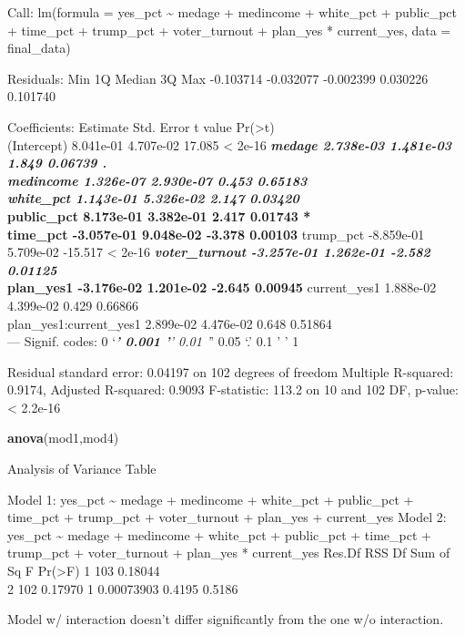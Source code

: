 \documentclass[
]{article}
\newenvironment{Shaded}{\begin{snugshade}}{\end{snugshade}}
\newcommand{\KeywordTok}[1]{\textcolor[rgb]{0.13,0.29,0.53}{\textbf{#1}}}
\newcommand{\NormalTok}[1]{#1}
\begin{document}
Call: lm(formula = yes\_pct \textasciitilde{} medage + medincome +
white\_pct + public\_pct + time\_pct + trump\_pct + voter\_turnout +
plan\_yes * current\_yes, data = final\_data)

Residuals: Min 1Q Median 3Q Max -0.103714 -0.032077 -0.002399 0.030226
0.101740

Coefficients: Estimate Std. Error t value
Pr(\textgreater\textbar t\textbar)\\
(Intercept) 8.041e-01 4.707e-02 17.085 \textless{} 2e-16 \textbf{\emph{
medage 2.738e-03 1.481e-03 1.849 0.06739 .\\
medincome 1.326e-07 2.930e-07 0.453 0.65183\\
white\_pct 1.143e-01 5.326e-02 2.147 0.03420 }\\
public\_pct 8.173e-01 3.382e-01 2.417 0.01743 *\\
time\_pct -3.057e-01 9.048e-02 -3.378 0.00103 } trump\_pct -8.859e-01
5.709e-02 -15.517 \textless{} 2e-16 \textbf{\emph{ voter\_turnout
-3.257e-01 1.262e-01 -2.582 0.01125 }\\
plan\_yes1 -3.176e-02 1.201e-02 -2.645 0.00945 } current\_yes1 1.888e-02
4.399e-02 0.429 0.66866\\
plan\_yes1:current\_yes1 2.899e-02 4.476e-02 0.648 0.51864\\
--- Signif. codes: 0 `\emph{\textbf{' 0.001 '}' 0.01 '}' 0.05 `.' 0.1 '
' 1

Residual standard error: 0.04197 on 102 degrees of freedom Multiple
R-squared: 0.9174, Adjusted R-squared: 0.9093 F-statistic: 113.2 on 10
and 102 DF, p-value: \textless{} 2.2e-16

\begin{Shaded}
\begin{Highlighting}[]
\KeywordTok{anova}\NormalTok{(mod1,mod4)}
\end{Highlighting}
\end{Shaded}

Analysis of Variance Table

Model 1: yes\_pct \textasciitilde{} medage + medincome + white\_pct +
public\_pct + time\_pct + trump\_pct + voter\_turnout + plan\_yes +
current\_yes Model 2: yes\_pct \textasciitilde{} medage + medincome +
white\_pct + public\_pct + time\_pct + trump\_pct + voter\_turnout +
plan\_yes * current\_yes Res.Df RSS Df Sum of Sq F Pr(\textgreater F) 1
103 0.18044\\
2 102 0.17970 1 0.00073903 0.4195 0.5186

Model w/ interaction doesn't differ significantly from the one w/o
interaction.
\end{document}

